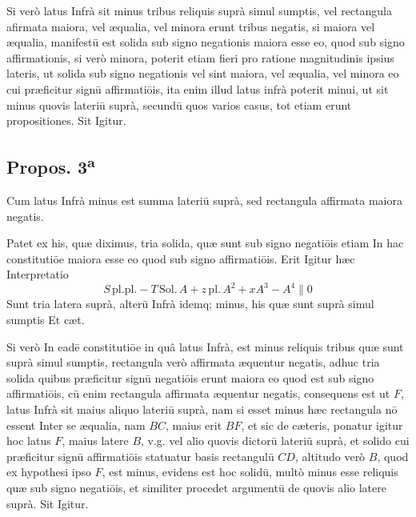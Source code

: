 \documentclass[11pt,a4paper]{article}
\begin{document}
Si verò latus Infrà sit minus tribus reliquis suprà simul sumptis, vel rectangula afirmata maiora, vel æqualia, vel minora erunt tribus negatis, si maiora vel æqualia, manifestū est solida sub signo negationis maiora esse eo, quod sub signo affirmationis, si verò minora, poterit etiam fieri pro ratione magnitudinis ipsius lateris, ut solida sub signo negationis vel sint maiora, vel æqualia, vel minora eo cui præficitur signū affirmatiōis, ita enim illud latus infrà poterit minui, ut sit minus quovis lateriū suprà, secundū quos varios casus, tot etiam erunt propositiones. Sit Igitur.

\subsection*{Propos. 3\textsuperscript{a}}

Cum latus Infrà minus est summa lateriū suprà, sed rectangula affirmata maiora negatis.

Patet ex his, quæ diximus, tria solida, quæ sunt sub signo negatiōis etiam In hac constitutiōe maiora esse eo quod sub signo affirmatiōis. Erit Igitur hæc Interpretatio
\[ S\,\mathrm{pl.pl.} - T\,\mathrm{Sol.}\,A + z\,\mathrm{pl.}\,A^{2} + xA^{3} - A^{4} \parallel 0 \]
Sunt tria latera suprà, alterū Infrà idemq; minus, his quæ sunt suprà simul sumptis Et cæt.


Si verò In eadē constitutiōe in quâ latus Infrà, est minus reliquis tribus quæ sunt suprà simul sumptis, rectangula verò affirmata æquentur negatis, adhuc tria solida quibus præficitur signū negatiōis erunt maiora eo quod est sub signo affirmatiōis, cū enim rectangula affirmata æquentur negatis, consequens est ut $F$, latus Infrà sit maius aliquo lateriū suprà, nam si esset minus hæc rectangula nō essent Inter se æqualia, nam $BC$, maius erit $BF$, et sic de cæteris, ponatur igitur hoc latus $F$, maius latere $B$, v.g. vel alio quovis dictorū lateriū suprà, et solido cui præficitur signū affirmatiōis statuatur basis rectangulū $CD$, altitudo verò $B$, quod ex hypothesi ipso $F$, est minus, evidens est hoc solidū, multò minus esse reliquis quæ sub signo negatiōis, et similiter procedet argumentū de quovis alio latere suprà. Sit Igitur.
\end{document}
